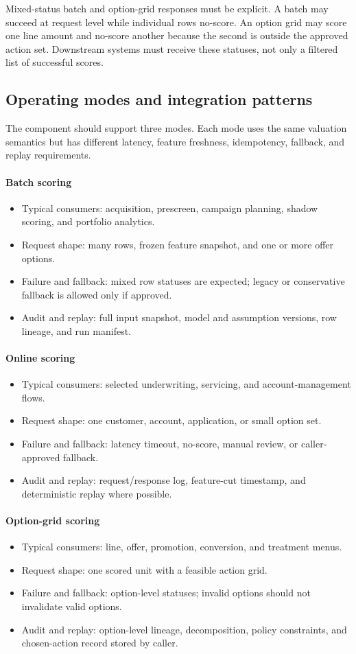 \documentclass[11pt]{article}
\newcommand{\1}{\mathbf{1}}
\newcommand{\contractitem}[2]{\paragraph{#1}\begin{itemize}[leftmargin=1.5em,itemsep=0.12em,topsep=0.18em]#2\end{itemize}}
\begin{document}
Mixed-status batch and option-grid responses must be explicit. A batch may
succeed at request level while individual rows no-score. An option grid may
score one line amount and no-score another because the second is outside the
approved action set. Downstream systems must receive these statuses, not only a
filtered list of successful scores.

\subsection{Operating modes and integration patterns}
\label{subsec:operating-modes}

The component should support three modes. Each mode uses the same valuation
semantics but has different latency, feature freshness, idempotency, fallback,
and replay requirements.

\contractitem{Batch scoring}{
  \item Typical consumers: acquisition, prescreen, campaign planning, shadow
        scoring, and portfolio analytics.
  \item Request shape: many rows, frozen feature snapshot, and one or more
        offer options.
  \item Failure and fallback: mixed row statuses are expected; legacy or
        conservative fallback is allowed only if approved.
  \item Audit and replay: full input snapshot, model and assumption versions,
        row lineage, and run manifest.
}
\contractitem{Online scoring}{
  \item Typical consumers: selected underwriting, servicing, and
        account-management flows.
  \item Request shape: one customer, account, application, or small option set.
  \item Failure and fallback: latency timeout, no-score, manual review, or
        caller-approved fallback.
  \item Audit and replay: request/response log, feature-cut timestamp, and
        deterministic replay where possible.
}
\contractitem{Option-grid scoring}{
  \item Typical consumers: line, offer, promotion, conversion, and treatment
        menus.
  \item Request shape: one scored unit with a feasible action grid.
  \item Failure and fallback: option-level statuses; invalid options should not
        invalidate valid options.
  \item Audit and replay: option-level lineage, decomposition, policy
        constraints, and chosen-action record stored by caller.
}
\end{document}
